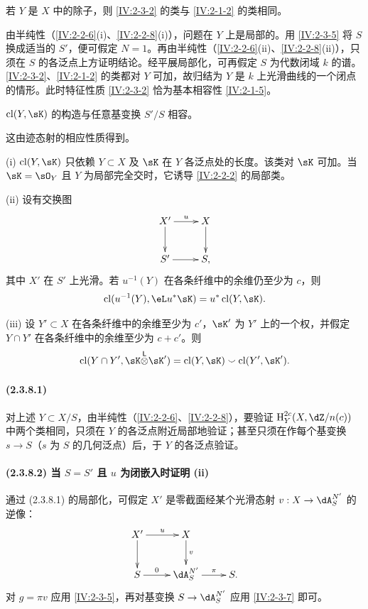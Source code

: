 \begin{lemma}\label{IV:2-3-6}
若 $Y$ 是 $X$ 中的除子，则 \ref{IV:2-3-2} 的类与 \ref{IV:2-1-2} 的类相同。
\end{lemma}
由半纯性（\ref{IV:2-2-6}(i)、\ref{IV:2-2-8}(i)），问题在 $Y$ 上是局部的。用 \ref{IV:2-3-5} 将 $S$ 换成适当的 $S'$，便可假定 $N=1$。再由半纯性（\ref{IV:2-2-6}(ii)、\ref{IV:2-2-8}(ii)），只须在 $S$ 的各泛点上方证明结论。经平展局部化，可再假定 $S$ 为代数闭域 $k$ 的谱。\ref{IV:2-3-2}、\ref{IV:2-1-2} 的类都对 $Y$ 可加，故归结为 $Y$ 是 $k$ 上光滑曲线的一个闭点的情形。此时特征性质 \ref{IV:2-3-2} 恰为基本相容性 \ref{IV:2-1-5}。

\begin{lemma}\label{IV:2-3-7}
$\cl(Y,\sK)$ 的构造与任意基变换 $S'/S$ 相容。
\end{lemma}
这由迹态射的相应性质得到。

\begin{theorem}\label{IV:2-3-8}
(i) $\cl(Y,\sK)$ 只依赖 $Y\subset X$ 及 $\sK$ 在 $Y$ 各泛点处的长度。该类对 $\sK$ 可加。当 $\sK=\sO_Y$ 且 $Y$ 为局部完全交时，它诱导 \ref{IV:2-2-2} 的局部类。

(ii) 设有交换图
\[\xymatrix{X'\ar[r]^-u\ar[d]&X\ar[d]\\S'\ar[r]&S,}\]
其中 $X'$ 在 $S'$ 上光滑。若 $u^{-1}(Y)$ 在各条纤维中的余维仍至少为 $c$，则
\[
\cl(u^{-1}(Y),\eL u^*\sK)=u^*\cl(Y,\sK).
\]

(iii) 设 $Y'\subset X$ 在各条纤维中的余维至少为 $c'$，$\sK'$ 为 $Y'$ 上的一个权，并假定 $Y\cap Y'$ 在各条纤维中的余维至少为 $c+c'$。则
\[
\cl(Y\cap Y',\sK\lotimes\sK')=\cl(Y,\sK)\smallsmile\cl(Y',\sK').
\]
\end{theorem}

\paragraph{(2.3.8.1)}
对上述 $Y\subset X/S$，由半纯性（\ref{IV:2-2-6}、\ref{IV:2-2-8}），要验证 $\h_Y^{2c}(X,\dZ/n(c))$ 中两个类相同，只须在 $Y$ 的各泛点附近局部地验证；甚至只须在作每个基变换 $s\to S$（$s$ 为 $S$ 的几何泛点）后，于 $Y$ 的各泛点验证。

\paragraph{(2.3.8.2) 当 $S=S'$ 且 $u$ 为闭嵌入时证明 (ii)}
通过 (2.3.8.1) 的局部化，可假定 $X'$ 是零截面经某个光滑态射 $v:X\to\dA_S^{N'}$ 的逆像：
\[\xymatrix{X'\ar[r]^-u\ar[d]&X\ar[d]^-v\\S\ar[r]^-0&\dA_S^{N'}\ar[r]^-\pi&S.}\]
对 $g=\pi v$ 应用 \ref{IV:2-3-5}，再对基变换 $S\to\dA_S^{N'}$ 应用 \ref{IV:2-3-7} 即可。

